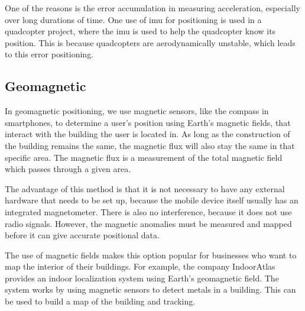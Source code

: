 One of the reasons is the error accumulation in measuring acceleration, especially over long durations of time. One use of \gls{imu} for positioning is used in a quadcopter project, where the \gls{imu} is used to help the quadcopter know its position. This is because quadcopters are aerodynamically unstable, which leads to this error positioning.\cite{IMUQuadcopter}


\subsection{Geomagnetic}
In geomagnetic positioning, we use magnetic sensors, like the compass in smartphones, to determine a user's position using Earth's magnetic fields, that interact with the building the user is located in\cite{IPSMapsPeople}. As long as the construction of the building remains the same, the magnetic flux will also stay the same in that specific area. The magnetic flux is a measurement of the total magnetic field which passes through a given area.\cite{magneticflux}

The advantage of this method is that it is not necessary to have any external hardware that needs to be set up, because the mobile device itself usually has an integrated magnetometer. There is also no interference, because it does not use radio signals. However, the magnetic anomalies must be measured and mapped before it can give accurate positional data.\cite{magneticperformance}

The use of magnetic fields makes this option popular for businesses who want to map the interior of their buildings\cite{magneticperformance}. For example, the company IndoorAtlas provides an indoor localization system using Earth's geomagnetic field. The system works by using magnetic sensors to detect metals in a building. This can be used to build a map of the building and tracking.\cite{IndoorAtlas}


